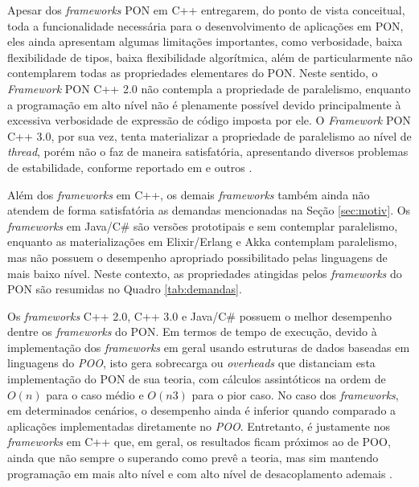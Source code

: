 Apesar dos \textit{frameworks} PON em C++ entregarem, do ponto de vista
conceitual, toda a funcionalidade necessária para o desenvolvimento de
aplicações em PON, eles ainda apresentam algumas limitações importantes, como
verbosidade, baixa flexibilidade de tipos, baixa flexibilidade algorítmica, além
de particularmente não contemplarem todas as propriedades elementares do PON.
Neste sentido, o \textit{Framework} PON C++ 2.0 não contempla a propriedade de
paralelismo, enquanto a programação em alto nível não é plenamente possível
devido principalmente à excessiva verbosidade de expressão de código imposta por
ele. O \textit{Framework} PON C++ 3.0, por sua vez, tenta materializar a
propriedade de paralelismo ao nível de \textit{thread}, porém não o faz de
maneira satisfatória, apresentando diversos problemas de estabilidade, conforme
reportado em  e outros
\cite{martini_2019,doc_ronszcka_2019,msc_negrini_2019}.

Além dos \textit{frameworks} em C++, os demais \textit{frameworks} também ainda
não atendem de forma satisfatória as demandas mencionadas na Seção
\ref{sec:motiv}. Os \textit{frameworks} em Java/C\# são versões prototipais e
sem contemplar paralelismo, enquanto as materializações em Elixir/Erlang e Akka
contemplam paralelismo, mas não possuem o desempenho apropriado possibilitado
pelas linguagens de mais baixo nível. Neste contexto, as propriedades atingidas
pelos \textit{frameworks} do PON são resumidas no Quadro \ref{tab:demandas}.

Os \textit{frameworks} C++ 2.0, C++ 3.0 e Java/C\# possuem o melhor desempenho
dentre os \textit{frameworks} do PON. Em termos de tempo de execução, devido à
implementação dos \textit{frameworks} em geral usando estruturas de dados
baseadas em linguagens do \textit{POO}, isto gera sobrecarga ou
\textit{overheads} que distanciam esta implementação do PON de sua teoria, com
cálculos assintóticos na ordem de \(O(n)\) para o caso médio e \(O(n3)\) para o
pior caso. No caso dos \textit{frameworks}, em determinados cenários, o
desempenho ainda é inferior quando comparado a aplicações implementadas
diretamente no \textit{POO}. Entretanto, é justamente nos \textit{frameworks} em
C++ que, em geral, os resultados ficam próximos ao de POO, ainda que não sempre
o superando como prevê a teoria, mas sim mantendo programação em mais alto nível
e com alto nível de desacoplamento ademais
\cite{msc_Banaszewski_2009,msc_valenca_2012}.

